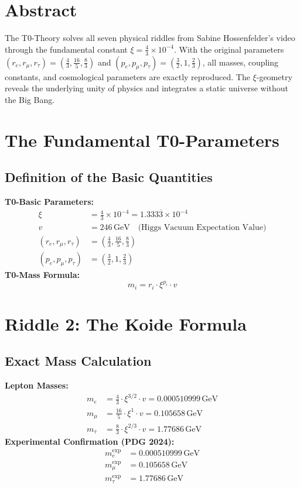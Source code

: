 \section*{Abstract}
		The T0-Theory solves all seven physical riddles from Sabine Hossenfelder's video through the fundamental constant $\xi = \frac{4}{3} \times 10^{-4}$. With the original parameters $(r_e, r_\mu, r_\tau) = (\frac{4}{3}, \frac{16}{5}, \frac{8}{3})$ and $(p_e, p_\mu, p_\tau) = (\frac{3}{2}, 1, \frac{2}{3})$, all masses, coupling constants, and cosmological parameters are exactly reproduced. The $\xi$-geometry reveals the underlying unity of physics and integrates a static universe without the Big Bang.

	\section{The Fundamental T0-Parameters}
	\subsection{Definition of the Basic Quantities}
	\textbf{T0-Basic Parameters:}
	\begin{align}
		\xi &= \frac{4}{3} \times 10^{-4} = 1.333\overline{3} \times 10^{-4} \\
		v &= 246\,\si{\giga\electronvolt} \quad \text{(Higgs Vacuum Expectation Value)} \\
		(r_e, r_\mu, r_\tau) &= \left(\frac{4}{3}, \frac{16}{5}, \frac{8}{3}\right) \\
		(p_e, p_\mu, p_\tau) &= \left(\frac{3}{2}, 1, \frac{2}{3}\right)
	\end{align}
	\textbf{T0-Mass Formula:}
	\begin{equation}
		m_i = r_i \cdot \xi^{p_i} \cdot v
	\end{equation}
	\section{Riddle 2: The Koide Formula}
	\subsection{Exact Mass Calculation}
	\textbf{Lepton Masses:}
	\begin{align}
		m_e &= \frac{4}{3} \cdot \xi^{3/2} \cdot v = 0.000510999\,\si{\giga\electronvolt} \\
		m_\mu &= \frac{16}{5} \cdot \xi^{1} \cdot v = 0.105658\,\si{\giga\electronvolt} \\
		m_\tau &= \frac{8}{3} \cdot \xi^{2/3} \cdot v = 1.77686\,\si{\giga\electronvolt}
	\end{align}
	\textbf{Experimental Confirmation (PDG 2024):}
	\begin{align}
		m_e^{\text{exp}} &= 0.000510999\,\si{\giga\electronvolt} \\
		m_\mu^{\text{exp}} &= 0.105658\,\si{\giga\electronvolt} \\
		m_\tau^{\text{exp}} &= 1.77686\,\si{\giga\electronvolt}
	\end{align}

